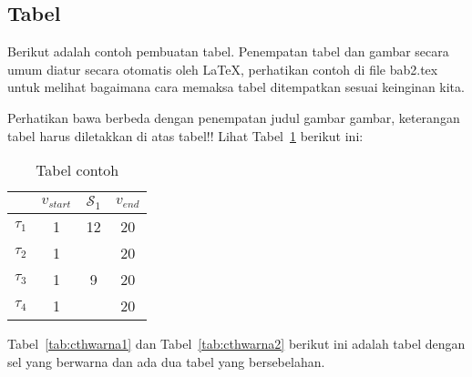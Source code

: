 \newpage
\subsection{Tabel}  
Berikut adalah contoh pembuatan tabel. 
Penempatan tabel dan gambar secara umum diatur secara otomatis oleh \LaTeX{}, perhatikan contoh di file bab2.tex untuk melihat bagaimana cara memaksa tabel ditempatkan sesuai keinginan kita.

Perhatikan bawa berbeda dengan penempatan judul gambar gambar, keterangan tabel harus diletakkan di atas tabel!!
Lihat Tabel~\ref{tab:contoh1} berikut ini:

\begin{table}[H] %
	\centering 
	\caption{Tabel contoh}
	\label{tab:contoh1}
	\begin{tabular}{cccc}
		\toprule
		& $v_{start}$ & $\mathcal{S}_{1}$ & $v_{end}$\\

		\midrule
		$\tau_{1}$ & 1 & 12& 20\\
		$\tau_{2}$ & 1 &  & 20\\
		$\tau_{3}$ & 1 & 9 & 20\\
		$\tau_{4}$ & 1 &  & 20\\

		\bottomrule
		
	\end{tabular} 
\end{table}
Tabel~\ref{tab:cthwarna1} dan Tabel~\ref{tab:cthwarna2} berikut ini adalah tabel dengan sel yang berwarna dan ada dua tabel yang bersebelahan. 
